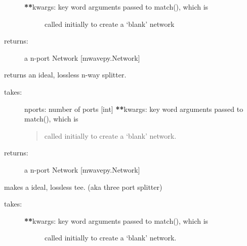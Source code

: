 \documentclass[letterpaper,10pt,english]{sphinxmanual}
\begin{document}
\begin{fulllineitems}
\begin{fulllineitems}
\begin{description}
\begin{description}
\item[{{\color{red}\bfseries{}**}kwargs: key word arguments passed to match(), which is }] \leavevmode
called initially to create a `blank' network

\end{description}

\item[{returns:}] \leavevmode
a n-port Network {[}mwavepy.Network{]}

\end{description}

\end{fulllineitems}


\begin{fulllineitems}
\label{auto_workingband:mwavepy.WorkingBand.splitter}
returns an ideal, lossless n-way splitter.
\begin{description}
\item[{takes:}] \leavevmode
nports: number of ports {[}int{]}
{\color{red}\bfseries{}**}kwargs: key word arguments passed to match(), which is
\begin{quote}

called initially to create a `blank' network.
\end{quote}

\item[{returns:}] \leavevmode
a n-port Network {[}mwavepy.Network{]}

\end{description}

\end{fulllineitems}


\begin{fulllineitems}
\label{auto_workingband:mwavepy.WorkingBand.tee}
makes a ideal, lossless tee. (aka three port splitter)
\begin{description}
\item[{takes:}] \leavevmode\begin{description}
\item[{{\color{red}\bfseries{}**}kwargs: key word arguments passed to match(), which is }] \leavevmode
called initially to create a `blank' network.

\end{description}


\end{description}
\end{fulllineitems}
\end{fulllineitems}
\end{document}

